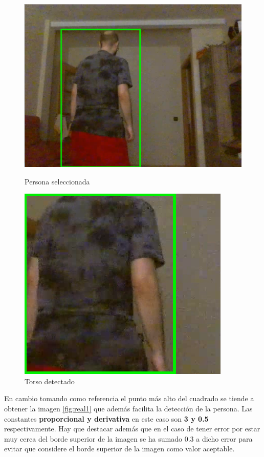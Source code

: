 \begin{figure}[!htb]
    \includegraphics[width=\linewidth]{figures/real/cap1.png}
    \caption{Persona seleccionada}\label{fig:real1}
\endminipage\hfill
{}
    \includegraphics[width=\linewidth]{figures/real/cap2.png}
    \caption{Torso detectado}\label{fig:real2}
\endminipage\hfill
\end{figure}

En cambio tomando como referencia el punto más alto del cuadrado se tiende a obtener la imagen \ref{fig:real1} que además facilita la detección de la persona.
Las constantes \textbf{proporcional y derivativa} en este caso son \textbf{3 y 0.5} respectivamente. Hay que destacar además que en el caso de tener error por estar muy cerca del borde superior de la imagen se ha sumado 0.3 a dicho error para evitar que considere el borde  superior de la imagen como valor aceptable. 


